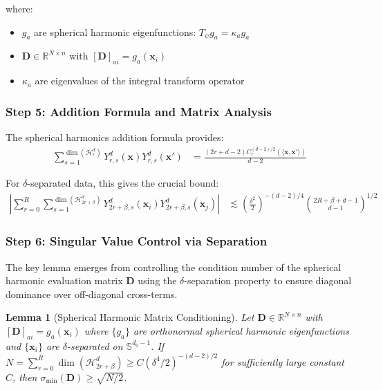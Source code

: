 \documentclass{article}
\newtheorem{lemma}[theorem]{Lemma}
\newcommand{\x}{\mathbf{x}}
\begin{document}
where:
\begin{itemize}
    \item $g_a$ are spherical harmonic eigenfunctions: $T_{\psi} g_a = \kappa_a g_a$
    \item $\mathbf{D} \in \mathbb{R}^{N \times n}$ with $[\mathbf{D}]_{ai} = g_a(\x_i)$
    \item $\kappa_a$ are eigenvalues of the integral transform operator
\end{itemize}

\subsubsection{Step 5: Addition Formula and Matrix Analysis}

The spherical harmonics addition formula provides:
\begin{align}
    \sum_{s=1}^{\dim(\mathcal{H}_r^d)} Y_{r,s}^d(\x) Y_{r,s}^d(\x') &= \frac{(2r + d - 2)C_r^{(d-2)/2}(\langle \x, \x' \rangle)}{d - 2}
\end{align}

For $\delta$-separated data, this gives the crucial bound:
\begin{align}
    \left|\sum_{r=0}^R \sum_{s=1}^{\dim(\mathcal{H}_{2r+\beta}^d)} Y_{2r+\beta,s}^d(\x_i) Y_{2r+\beta,s}^d(\x_j)\right| &\lesssim \left(\frac{\delta^2}{2}\right)^{-(d-2)/4} \binom{2R + \beta + d - 1}{d - 1}^{1/2}
\end{align}

\subsubsection{Step 6: Singular Value Control via Separation}

The key lemma emerges from controlling the condition number of the spherical harmonic evaluation matrix $\mathbf{D}$ using the $\delta$-separation property to ensure diagonal dominance over off-diagonal cross-terms.

\begin{lemma}[Spherical Harmonic Matrix Conditioning]
Let $\mathbf{D} \in \mathbb{R}^{N \times n}$ with $[\mathbf{D}]_{ai} = g_a(\x_i)$ where $\{g_a\}$ are orthonormal spherical harmonic eigenfunctions and $\{\x_i\}$ are $\delta$-separated on $\mathbb{S}^{d_0-1}$. If $N = \sum_{r=0}^R \dim(\mathcal{H}_{2r+\beta}^d) \geq C(\delta^4/2)^{-(d-2)/2}$ for sufficiently large constant $C$, then $\sigma_{\min}(\mathbf{D}) \geq \sqrt{N/2}$.
\end{lemma}
\end{document}
